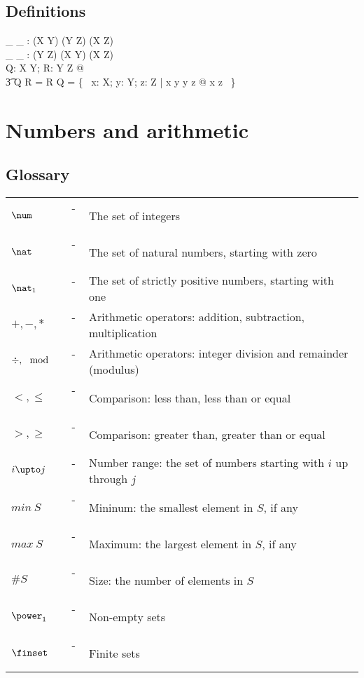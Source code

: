 \subsection*{Definitions}

\begin{gendef}[X,Y,Z]
	\_ \comp \_ : (X \rel Y) \cross (Y \rel Z) \fun (X \rel Z) \\
	\_ \circ \_ : (Y \rel Z) \cross (X \rel Y) \fun (X \rel Z) \\
\where
	\forall Q: X \rel Y; R: Y \rel Z @ \\
\t3		Q \comp R = R \circ Q = \{~ x: X; y: Y; z: Z | x  y \land y  z @ x \mapsto z ~\}
\end{gendef}

\newpage

\section*{Numbers and arithmetic}

\subsection*{Glossary}

\begin{tabular}{l c l}
$\num$ & ~-~ & The set of integers \\
$\nat$ & ~-~ & The set of natural numbers, starting with zero \\
$\nat_1$ & ~-~ & The set of strictly positive numbers, starting with one \\
$+,-,*$ & ~-~ & Arithmetic operators: addition, subtraction, multiplication \\
$\div,\mod$ & ~-~ & Arithmetic operators: integer division and remainder (modulus) \\
$<,\leq$ & ~-~ &  Comparison: less than, less than or equal \\
$>, \geq$ & ~-~ & Comparison: greater than, greater than or equal \\
$i \upto j$ & ~-~ & Number range: the set of numbers starting with $i$ up through $j$ \\
$min~S$ & ~-~ & Mininum: the smallest element in $S$, if any \\
$max~S$ & ~-~ & Maximum: the largest element in $S$, if any \\
$\# S$	& ~-~ & Size: the number of elements in $S$ \\
$\power_1$ & ~-~ & Non-empty sets \\
$\finset$ & ~-~ & Finite sets \\
\end{tabular}

